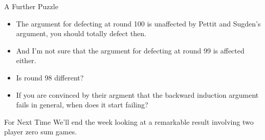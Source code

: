 \documentclass[
  ignorenonframetext,
]{beamer}
\providecommand{\tightlist}{%
  \setlength{\itemsep}{0pt}\setlength{\parskip}{0pt}}
\begin{document}
\begin{frame}{A Further Puzzle}
\protect\hypertarget{a-further-puzzle}{}
\begin{itemize}[<+->]
\tightlist
\item
  The argument for defecting at round 100 is unaffected by Pettit and
  Sugden's argument, you should totally defect then.
\item
  And I'm not sure that the argument for defecting at round 99 is
  affected either.
\item
  Is round 98 different?
\item
  If you are convinced by their argment that the backward induction
  argument fails in general, when does it start failing?
\end{itemize}
\end{frame}

\begin{frame}{For Next Time}
\protect\hypertarget{for-next-time}{}
We'll end the week looking at a remarkable result involving two player
zero sum games.
\end{frame}
\end{document}
